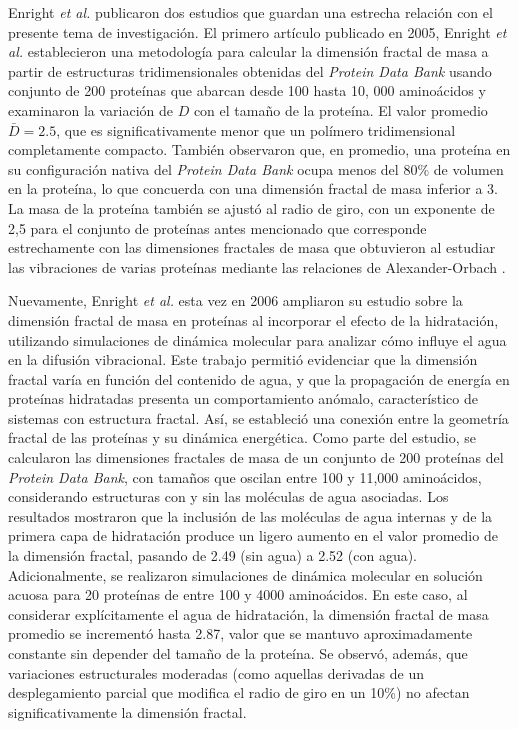 Enright \textit{et al.} publicaron dos estudios que guardan una estrecha relaci\'{o}n con el presente tema de investigaci\'{o}n. El primero art\'{i}culo publicado en 2005, Enright \textit{et al.}
\cite{Enright2005} establecieron una metodolog\'{i}a  para calcular la dimensi\'{o}n fractal de masa a partir de estructuras tridimensionales obtenidas del \textit{Protein Data Bank} usando conjunto de 200 prote\'{i}nas que abarcan desde 100 hasta 10, 000 amino\'{a}cidos y examinaron la variaci\'{o}n de $D$ con el tamaño de la prote\'{i}na. El valor promedio $\bar{D} = 2.5$, que es significativamente menor que un pol\'{i}mero tridimensional completamente compacto. Tambi\'{e}n observaron que, en promedio, una prote\'{i}na en su configuraci\'{o}n nativa del \textit{Protein Data Bank} ocupa menos del $80\%$ de volumen en la prote\'{i}na, lo que concuerda con una dimensi\'{o}n fractal de masa inferior a 3. La masa de la prote\'{i}na tambi\'{e}n se ajust\'{o} al radio de giro, con un exponente de 2,5 para el conjunto de prote\'{i}nas antes mencionado que corresponde estrechamente con las dimensiones fractales de masa que obtuvieron al estudiar las vibraciones de varias prote\'{i}nas mediante las relaciones de Alexander-Orbach \cite{Alexander1982}.
 
 Nuevamente, Enright \textit{et al.}\cite{Enright2006} esta vez en 2006 ampliaron su estudio sobre la dimensi\'{o}n fractal de masa en prote\'{i}nas al incorporar el efecto de la hidrataci\'{o}n, utilizando simulaciones de din\'{a}mica molecular para analizar c\'{o}mo influye el agua en la difusi\'{o}n vibracional. Este trabajo permiti\'{o} evidenciar que la dimensi\'{o}n fractal var\'{i}a en funci\'{o}n del contenido de agua, y que la propagaci\'{o}n de energ\'{i}a en prote\'{i}nas hidratadas presenta un comportamiento an\'{o}malo, caracter\'{i}stico de sistemas con estructura fractal. As\'{i}, se estableci\'{o} una conexi\'{o}n entre la geometr\'{i}a fractal de las prote\'{i}nas y su din\'{a}mica energ\'{e}tica. Como parte del estudio, se calcularon las dimensiones fractales de masa de un conjunto de 200 prote\'{i}nas del \textit{Protein Data Bank}, con tamaños que oscilan entre 100 y 11,000 amino\'{a}cidos, considerando estructuras con y sin las mol\'{e}culas de agua asociadas. Los resultados mostraron que la inclusi\'{o}n de las mol\'{e}culas de agua internas y de la primera capa de hidrataci\'{o}n produce un ligero aumento en el valor promedio de la dimensi\'{o}n fractal, pasando de 2.49 (sin agua) a 2.52 (con agua). Adicionalmente, se realizaron simulaciones de din\'{a}mica molecular en soluci\'{o}n acuosa para 20 prote\'{i}nas de entre 100 y 4000 amino\'{a}cidos. En este caso, al considerar expl\'{i}citamente el agua de hidrataci\'{o}n, la dimensi\'{o}n fractal de masa promedio se increment\'{o} hasta 2.87, valor que se mantuvo aproximadamente constante sin depender del tamaño de la prote\'{i}na. Se observ\'{o}, adem\'{a}s, que variaciones estructurales moderadas (como aquellas derivadas de un desplegamiento parcial que modifica el radio de giro en un 10\%) no afectan significativamente la dimensi\'{o}n fractal.

